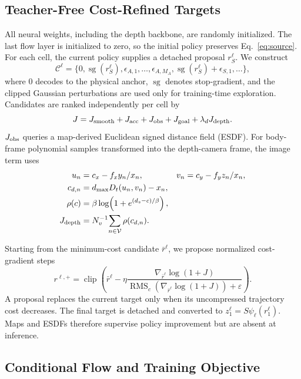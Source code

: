 \subsection{Teacher-Free Cost-Refined Targets}

All neural weights, including the depth backbone, are randomly initialized. The last flow layer is initialized to zero, so the initial policy preserves Eq.~\eqref{eq:source}. For each cell, the current policy supplies a detached proposal $r_S^\ell$. We construct
\begin{equation}
 \mathcal C^\ell=\{0,\operatorname{sg}(r_S^\ell),
 \epsilon_{A,1},\ldots,\epsilon_{A,M_A},
 \operatorname{sg}(r_S^\ell)+\epsilon_{S,1},\ldots\},
 \label{eq:candidates}
\end{equation}
where $0$ decodes to the physical anchor, $\operatorname{sg}$ denotes stop-gradient, and the clipped Gaussian perturbations are used only for training-time exploration. Candidates are ranked independently per cell by
\begin{equation}
 J=J_{\rm smooth}+J_{\rm acc}+J_{\rm obs}+J_{\rm goal}
   +\lambda_dJ_{\rm depth}.
 \label{eq:cost}
\end{equation}
$J_{\rm obs}$ queries a map-derived Euclidean signed distance field (ESDF). For body-frame polynomial samples transformed into the depth-camera frame, the image term uses
\begin{align}
 u_n&=c_x-f_xy_n/x_n, & v_n&=c_y-f_yz_n/x_n,\\
 c_{d,n}&=d_{\max}D_t(u_n,v_n)-x_n,\\
 \rho(c)&=\beta\log\!\left(1+e^{(d_s-c)/\beta}\right),\\
 J_{\rm depth}&=N_v^{-1}\!\sum_{n\in\mathcal V}\rho(c_{d,n}).
\end{align}

Starting from the minimum-cost candidate $\bar r^\ell$, we propose normalized cost-gradient steps
\begin{equation}
 r^{\ell,+}=\operatorname{clip}\!\left(\bar r^\ell-\eta
 \frac{\nabla_{\bar r^\ell}\log(1+J)}
 {\operatorname{RMS}_{c}(\nabla_{\bar r^\ell}\log(1+J))+\varepsilon}\right).
 \label{eq:refine}
\end{equation}
A proposal replaces the current target only when its uncompressed trajectory cost decreases. The final target is detached and converted to $z_1^\ell=S\psi_\ell(r_1^\ell)$. Maps and ESDFs therefore supervise policy improvement but are absent at inference.

\subsection{Conditional Flow and Training Objective}

